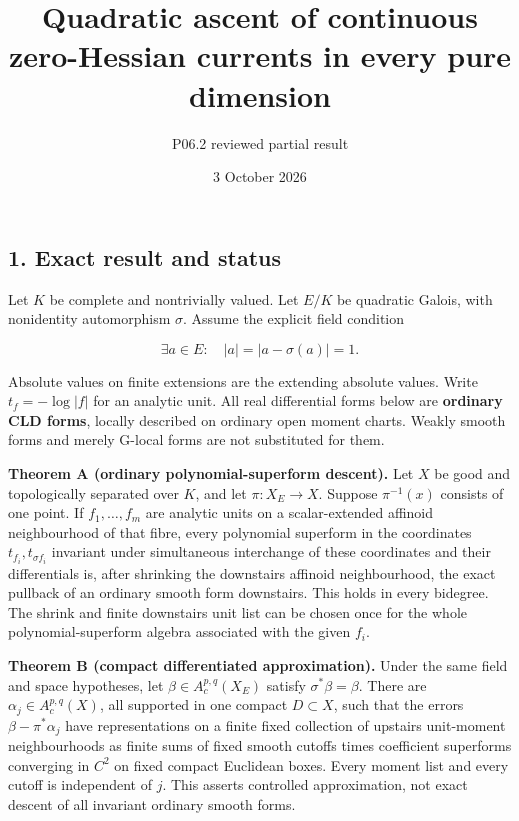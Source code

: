 \documentclass[
  11pt,
]{article}
\title{Quadratic ascent of continuous zero-Hessian currents in every
pure dimension}
\author{P06.2 reviewed partial result}
\date{3 October 2026}
\begin{document}
\maketitle

\subsection{1. Exact result and status}\label{exact-result-and-status}

Let \(K\) be complete and nontrivially valued. Let \(E/K\) be quadratic
Galois, with nonidentity automorphism \(\sigma\). Assume the explicit
field condition

\[\exists a\in E:\quad |a|=|a-\sigma(a)|=1. \tag{H}\]

Absolute values on finite extensions are the extending absolute values.
Write \(t_f=-\log|f|\) for an analytic unit. All real differential forms
below are \textbf{ordinary CLD forms}, locally described on ordinary
open moment charts. Weakly smooth forms and merely G-local forms are not
substituted for them.

\textbf{Theorem A (ordinary polynomial-superform descent).} Let \(X\) be
good and topologically separated over \(K\), and let \(\pi:X_E\to X\).
Suppose \(\pi^{-1}(x)\) consists of one point. If \(f_1,\ldots,f_m\) are
analytic units on a scalar-extended affinoid neighbourhood of that
fibre, every polynomial superform in the coordinates
\(t_{f_i},t_{\sigma f_i}\) invariant under simultaneous interchange of
these coordinates and their differentials is, after shrinking the
downstairs affinoid neighbourhood, the exact pullback of an ordinary
smooth form downstairs. This holds in every bidegree. The shrink and
finite downstairs unit list can be chosen once for the whole
polynomial-superform algebra associated with the given \(f_i\).

\textbf{Theorem B (compact differentiated approximation).} Under the
same field and space hypotheses, let \(\beta\in A_c^{p,q}(X_E)\) satisfy
\(\sigma^*\beta=\beta\). There are \(\alpha_j\in A_c^{p,q}(X)\), all
supported in one compact \(D\subset X\), such that the errors
\(\beta-\pi^*\alpha_j\) have representations on a finite fixed
collection of upstairs unit-moment neighbourhoods as finite sums of
fixed smooth cutoffs times coefficient superforms converging in \(C^2\)
on fixed compact Euclidean boxes. Every moment list and every cutoff is
independent of \(j\). This asserts controlled approximation, not exact
descent of all invariant ordinary smooth forms.
\end{document}
